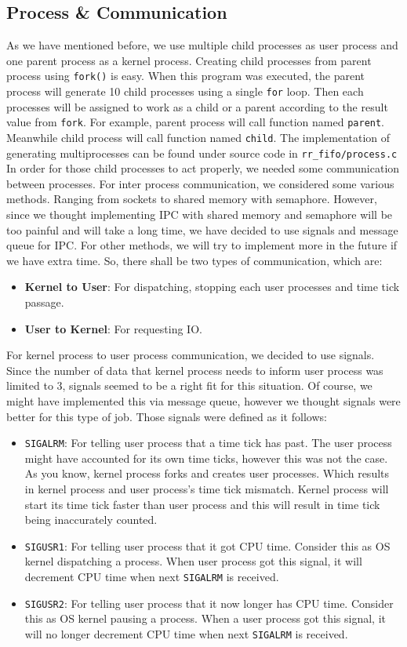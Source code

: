 \documentclass{homework}
\begin{document}
\subsection{Process & Communication}
As we have mentioned before, we use multiple child processes as user process and one parent process as a kernel process. Creating child processes from parent process using \texttt{fork()} is easy. When this program was executed, the parent process will generate 10 child processes using a single \texttt{for} loop. Then each processes will be assigned to work as a child or a parent according to the result value from \texttt{fork}. For example, parent process will call function named \texttt{parent}. Meanwhile child process will call function named \texttt{child}. The implementation of generating multiprocesses can be found under source code in \texttt{rr_fifo/process.c}
\\
In order for those child processes to act properly, we needed some communication between processes. For inter process communication, we considered some various methods. Ranging from sockets to shared memory with semaphore. However, since we thought implementing IPC with shared memory and semaphore will be too painful and will take a long time, we have decided to use signals and message queue for IPC. For other methods, we will try to implement more in the future if we have extra time. So, there shall be two types of communication, which are:
\begin{itemize}
    \item \textbf{Kernel to User}: For dispatching, stopping each user processes and time tick passage.
    \item \textbf{User to Kernel}: For requesting IO.
\end{itemize}
For kernel process to user process communication, we decided to use signals. Since the number of data that kernel process needs to inform user process was limited to 3, signals seemed to be a right fit for this situation. Of course, we might have implemented this via message queue, however we thought signals were better for this type of job. Those signals were defined as it follows:
\label{sec:childSignals}
\begin{itemize}
    \item \texttt{SIGALRM}: For telling user process that a time tick has past. The user process might have accounted for its own time ticks, however this was not the case. As you know, kernel process forks and creates user processes. Which results in kernel process and user process's time tick mismatch. Kernel process will start its time tick faster than user process and this will result in time tick being inaccurately counted.
    \item \texttt{SIGUSR1}: For telling user process that it got CPU time. Consider this as OS kernel dispatching a process. When user process got this signal, it will decrement CPU time when next \texttt{SIGALRM} is received.
    \item \texttt{SIGUSR2}: For telling user process that it now longer has CPU time. Consider this as OS kernel pausing a process. When a user process got this signal, it will no longer decrement CPU time when next \texttt{SIGALRM} is received.     
\end{itemize}
\end{document}
